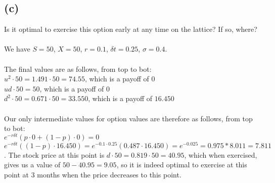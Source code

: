 \documentclass{article}
\begin{document}
{\subsection*{(c)}

Is it optimal to exercise this option early at any time on the lattice? If so, where? \\ \\
We have $S = 50$, $X = 50$, $r = 0.1$, $\delta t = 0.25$, $\sigma = 0.4$. \\ \\
The final values are as follows, from top to bot: \\
$u^2 \cdot 50 = 1.491 \cdot 50 = 74.55$, which is a payoff of $0$ \\
$ud \cdot 50 = 50$, which is a payoff of $0$ \\
$d^2 \cdot 50 = 0.671 \cdot 50 = 33.550$, which is a payoff of $16.450$ \\ \\
Our only intermediate values for option values are therefore as follows, from top to bot: \\
$e^{-r \delta t} (p \cdot 0 + (1-p) \cdot 0) = 0$ \\
$e^{-r \delta t} ((1-p) \cdot 16.450) = e^{-0.1 \cdot 0.25} (0.487 \cdot 16.450) = e^{-0.025} = 0.975 * 8.011 = 7.811$. The stock price at this point is $d \cdot 50 = 0.819 \cdot 50 = 40.95$, which when exercised, gives us a value of $50 - 40.95 = 9.05$, so it is indeed optimal to exercise at this point at 3 months when the price decreases to this point.

}
\end{document}
